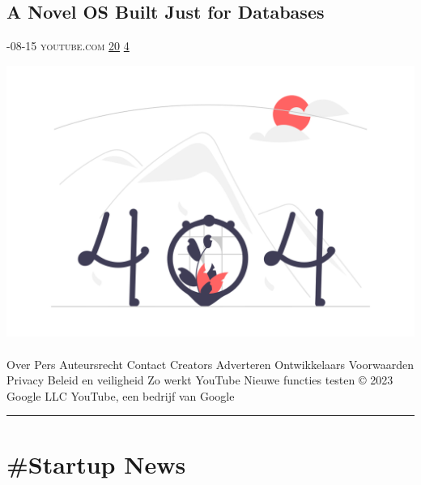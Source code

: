 \documentclass[10pt,a4paper]{article}
\begin{document}
\begin{multicols*}{2}
\begin{minipage}{\linewidth}
\subsection{A Novel OS Built Just for Databases}
\textsc{\footnotesize
{\scriptsize\faCalendar}-08-15 
{\scriptsize\faYoutube}\space 
youtube.com 
{\scriptsize\faThumbsOUp}\space 
\href{http://news.ycombinator.com/item?id=37179905\&utm\_term=comment}{20} 
{\scriptsize\faComments}\space 
\href{http://news.ycombinator.com/item?id=37179905\&utm\_term=comment}{4} 
}
\par\medskip\noindent
\href{https://www.youtube.com/watch?v=fuDeLnbUkT4\&utm\_source=hackernewsletter\&utm\_medium=email\&utm\_term=watching}{
    \includegraphics[width=0.99\linewidth]{notfound.png}
}
\end{minipage}
\paragraph{}
Over
Pers
Auteursrecht
Contact
Creators
Adverteren
Ontwikkelaars
Voorwaarden
Privacy
Beleid en veiligheid
Zo werkt YouTube
Nieuwe functies testen
© 2023 Google LLC
YouTube, een bedrijf van Google
\par\noindent\textcolor{red}{\rule{\linewidth}{0.2mm}}
\vfill
\null
\end{multicols*}

\newpage
\section{\#Startup News}
\end{document}
